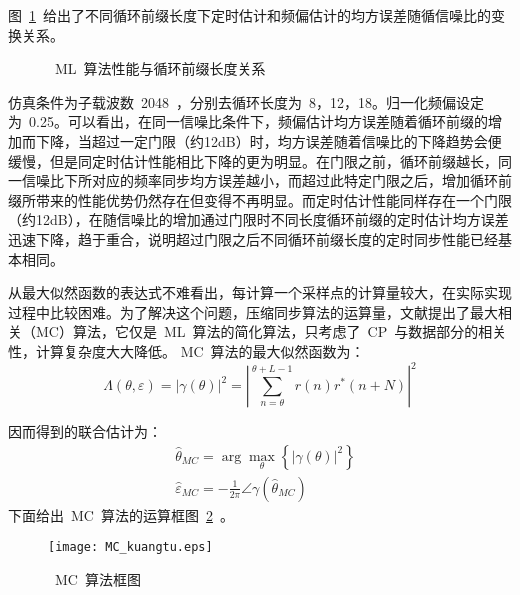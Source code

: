 图~\ref{Performance_by_CP}~给出了不同循环前缀长度下定时估计和频偏估计的均方误差随循信噪比的变换关系。
\begin{figure}[htbp]
\centering
{}
\caption{~ML~算法性能与循环前缀长度关系}\label{Performance_by_CP}
\vspace{-1em}
\end{figure}
仿真条件为子载波数~2048~，分别去循环长度为~8，12，18。归一化频偏设定为~0.25。可以看出，在同一信噪比条件下，频偏估计均方误差随着循环前缀的增加而下降，当超过一定门限（约12dB）时，均方误差随着信噪比的下降趋势会便缓慢，但是同定时估计性能相比下降的更为明显。在门限之前，循环前缀越长，同一信噪比下所对应的频率同步均方误差越小，而超过此特定门限之后，增加循环前缀所带来的性能优势仍然存在但变得不再明显。而定时估计性能同样存在一个门限（约12dB），在随信噪比的增加通过门限时不同长度循环前缀的定时估计均方误差迅速下降，趋于重合，说明超过门限之后不同循环前缀长度的定时同步性能已经基本相同。

从最大似然函数的表达式不难看出，每计算一个采样点的计算量较大，在实际实现过程中比较困难。为了解决这个问题，压缩同步算法的运算量，文献提出了最大相关（MC）算法，它仅是~ML~算法的简化算法，只考虑了~CP~与数据部分的相关性，计算复杂度大大降低。
MC~算法的最大似然函数为：
\begin{equation}
\Lambda \left( {\theta ,\varepsilon } \right) = {\left| {\gamma \left( \theta  \right)} \right|^2} = {\left| {\sum\limits_{n = \theta }^{\theta  + L - 1} {r\left( n \right){r^*}\left( {n + N} \right)} } \right|^2}
\end{equation}

因而得到的联合估计为：
\begin{align}
&{{\hat \theta }_{MC}} = \arg \mathop {\max }\limits_\theta  \left\{ {{{\left| {\gamma \left( \theta  \right)} \right|}^2}} \right\} \\
&{{\hat \varepsilon }_{MC}} =  - \frac{1}{{2\pi }}\angle \gamma \left( {{{\hat \theta }_{MC}}} \right)
\end{align}
下面给出~MC~算法的运算框图~\ref{MC_kuangtu}~。
\begin{figure}[htbp]
\centering
\texttt{[image: MC\_kuangtu.eps]}
\caption{~MC~算法框图}\vspace{-1em}\label{MC_kuangtu}
\end{figure}

